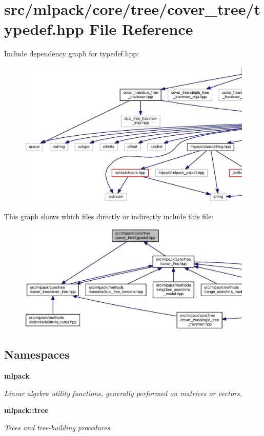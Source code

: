 \section{src/mlpack/core/tree/cover\+\_\+tree/typedef.hpp File Reference}
\label{core_2tree_2cover__tree_2typedef_8hpp}
Include dependency graph for typedef.\+hpp\+:
\nopagebreak
\begin{figure}[H]
\begin{center}
\leavevmode
\includegraphics[width=350pt]{core_2tree_2cover__tree_2typedef_8hpp__incl}
\end{center}
\end{figure}
This graph shows which files directly or indirectly include this file\+:
\nopagebreak
\begin{figure}[H]
\begin{center}
\leavevmode
\includegraphics[width=350pt]{core_2tree_2cover__tree_2typedef_8hpp__dep__incl}
\end{center}
\end{figure}
\subsection*{Namespaces}
\begin{DoxyCompactItemize}
\item 
 {\bf mlpack}
\begin{DoxyCompactList}\small\item\em Linear algebra utility functions, generally performed on matrices or vectors. \end{DoxyCompactList}\item 
 {\bf mlpack\+::tree}
\begin{DoxyCompactList}\small\item\em Trees and tree-\/building procedures. \end{DoxyCompactList}\end{DoxyCompactItemize}
